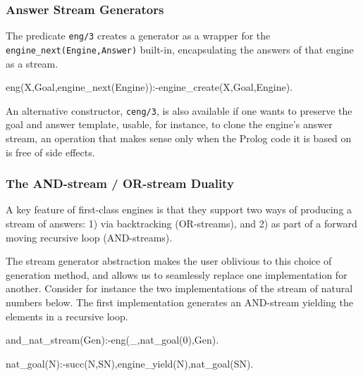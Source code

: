 \documentclass{new_tlp}
\begin{document}
\begin{comment}
As Prolog virtual machines, engines have  an internal state. Thus interacting with them requires a concise and expressive, but ultimately procedural API. This is not very different from what working with attributed variables, instrumental to adding constraint solvers, requires.
\end{comment}

\subsubsection{Answer Stream Generators}

The predicate {\tt eng/3} creates a generator as a wrapper for the {\tt
engine\_next(Engine,Answer)} built-in, encapsulating the answers of that engine
as a stream.
\begin{code}
eng(X,Goal,engine_next(Engine)):-engine_create(X,Goal,Engine). 
\end{code}
An alternative constructor, {\tt ceng/3}, is also available if one wants to preserve
the goal and answer template, usable, for instance, to clone
the engine's answer stream, an
operation that makes sense only when the Prolog code it is based on 
is free of side effects.

\subsubsection{The AND-stream / OR-stream Duality}

A key feature of first-class engines is that they support two ways of producing
a stream of answers: 1) via backtracking (OR-streams), and 2) as part of a
forward moving recursive loop (AND-streams).

The stream generator abstraction makes the user oblivious to this choice of
generation method, and allows us to seamlessly replace one implementation 
for another. Consider for instance the two implementations of the stream of natural
numbers below.
The first implementation generates an AND-stream yielding the elements in a
recursive loop.
\begin{code}
and_nat_stream(Gen):-eng(_,nat_goal(0),Gen).

nat_goal(N):-succ(N,SN),engine_yield(N),nat_goal(SN).
\end{code}
\end{document}
